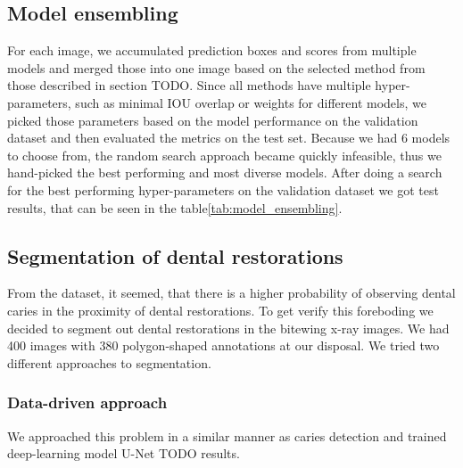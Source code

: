 \subsection{Model ensembling}
For each image, we accumulated prediction boxes and scores from multiple models and merged those into one image based on the selected method from those described in section TODO. Since all methods have multiple hyper-parameters, such as minimal IOU overlap or weights for different models, we picked those parameters based on the model performance on the validation dataset and then evaluated the metrics on the test set. Because we had 6 models to choose from, the random search approach became quickly infeasible, thus we hand-picked the best performing and most diverse models. After doing a search for the best performing hyper-parameters on the validation dataset we got test results, that can be seen in the table\ref{tab:model_ensembling}.

\subsection{Segmentation of dental restorations}
From the dataset, it seemed, that there is a higher probability of observing dental caries in the proximity of dental restorations. To get verify this foreboding we decided to segment out dental restorations in the bitewing x-ray images. We had 400 images with 380 polygon-shaped annotations at our disposal. We tried two different approaches to segmentation.

\subsubsection{Data-driven approach}
We approached this problem in a similar manner as caries detection and trained deep-learning model U-Net TODO results.

